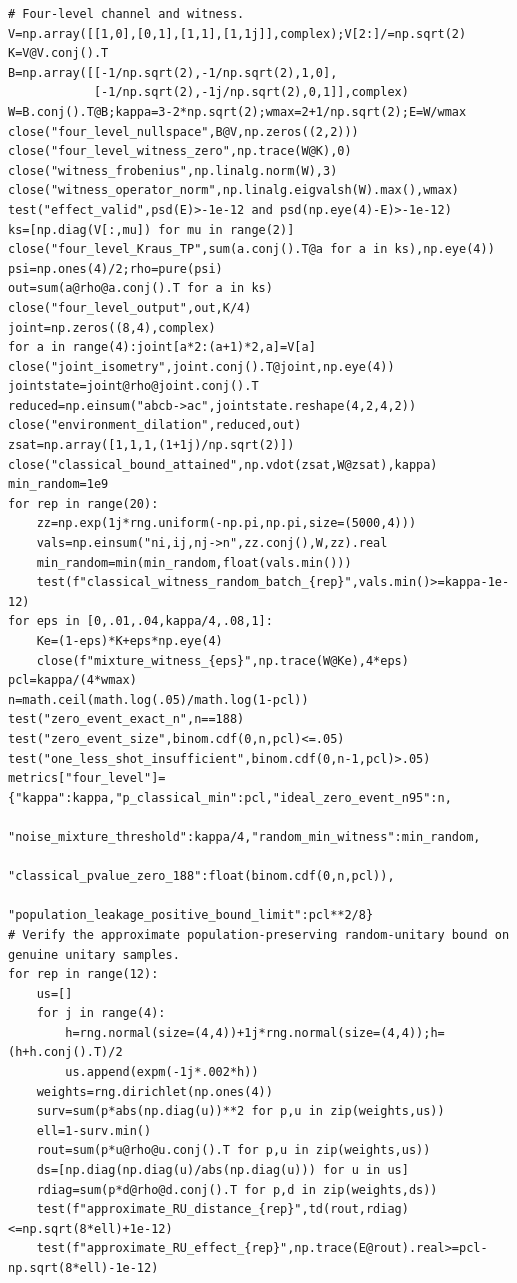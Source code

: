 \documentclass[
  11pt,
  oneside]{book}
\begin{document}
\begin{Verbatim}[breaklines,breakanywhere,fontsize=\scriptsize]
# Four-level channel and witness.
V=np.array([[1,0],[0,1],[1,1],[1,1j]],complex);V[2:]/=np.sqrt(2)
K=V@V.conj().T
B=np.array([[-1/np.sqrt(2),-1/np.sqrt(2),1,0],
            [-1/np.sqrt(2),-1j/np.sqrt(2),0,1]],complex)
W=B.conj().T@B;kappa=3-2*np.sqrt(2);wmax=2+1/np.sqrt(2);E=W/wmax
close("four_level_nullspace",B@V,np.zeros((2,2)))
close("four_level_witness_zero",np.trace(W@K),0)
close("witness_frobenius",np.linalg.norm(W),3)
close("witness_operator_norm",np.linalg.eigvalsh(W).max(),wmax)
test("effect_valid",psd(E)>-1e-12 and psd(np.eye(4)-E)>-1e-12)
ks=[np.diag(V[:,mu]) for mu in range(2)]
close("four_level_Kraus_TP",sum(a.conj().T@a for a in ks),np.eye(4))
psi=np.ones(4)/2;rho=pure(psi)
out=sum(a@rho@a.conj().T for a in ks)
close("four_level_output",out,K/4)
joint=np.zeros((8,4),complex)
for a in range(4):joint[a*2:(a+1)*2,a]=V[a]
close("joint_isometry",joint.conj().T@joint,np.eye(4))
jointstate=joint@rho@joint.conj().T
reduced=np.einsum("abcb->ac",jointstate.reshape(4,2,4,2))
close("environment_dilation",reduced,out)
zsat=np.array([1,1,1,(1+1j)/np.sqrt(2)])
close("classical_bound_attained",np.vdot(zsat,W@zsat),kappa)
min_random=1e9
for rep in range(20):
    zz=np.exp(1j*rng.uniform(-np.pi,np.pi,size=(5000,4)))
    vals=np.einsum("ni,ij,nj->n",zz.conj(),W,zz).real
    min_random=min(min_random,float(vals.min()))
    test(f"classical_witness_random_batch_{rep}",vals.min()>=kappa-1e-12)
for eps in [0,.01,.04,kappa/4,.08,1]:
    Ke=(1-eps)*K+eps*np.eye(4)
    close(f"mixture_witness_{eps}",np.trace(W@Ke),4*eps)
pcl=kappa/(4*wmax)
n=math.ceil(math.log(.05)/math.log(1-pcl))
test("zero_event_exact_n",n==188)
test("zero_event_size",binom.cdf(0,n,pcl)<=.05)
test("one_less_shot_insufficient",binom.cdf(0,n-1,pcl)>.05)
metrics["four_level"]={"kappa":kappa,"p_classical_min":pcl,"ideal_zero_event_n95":n,
                      "noise_mixture_threshold":kappa/4,"random_min_witness":min_random,
                      "classical_pvalue_zero_188":float(binom.cdf(0,n,pcl)),
                      "population_leakage_positive_bound_limit":pcl**2/8}
# Verify the approximate population-preserving random-unitary bound on genuine unitary samples.
for rep in range(12):
    us=[]
    for j in range(4):
        h=rng.normal(size=(4,4))+1j*rng.normal(size=(4,4));h=(h+h.conj().T)/2
        us.append(expm(-1j*.002*h))
    weights=rng.dirichlet(np.ones(4))
    surv=sum(p*abs(np.diag(u))**2 for p,u in zip(weights,us))
    ell=1-surv.min()
    rout=sum(p*u@rho@u.conj().T for p,u in zip(weights,us))
    ds=[np.diag(np.diag(u)/abs(np.diag(u))) for u in us]
    rdiag=sum(p*d@rho@d.conj().T for p,d in zip(weights,ds))
    test(f"approximate_RU_distance_{rep}",td(rout,rdiag)<=np.sqrt(8*ell)+1e-12)
    test(f"approximate_RU_effect_{rep}",np.trace(E@rout).real>=pcl-np.sqrt(8*ell)-1e-12)


\end{Verbatim}
\end{document}

